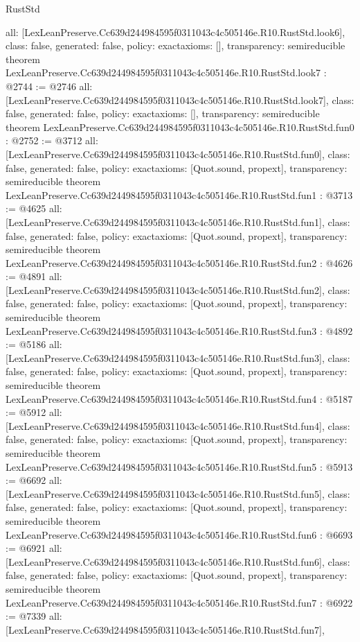 \begin{lexlean}{RustStd}
\begin{coremodule}
{  all: [LexLeanPreserve.Cc639d244984595f0311043c4c505146e.R10.RustStd.look6],
  class: false,
  generated: false,
  policy: exact{axioms: []},
  transparency: semireducible
}
theorem LexLeanPreserve.Cc639d244984595f0311043c4c505146e.R10.RustStd.look7 : @2744 := @2746 {
  all: [LexLeanPreserve.Cc639d244984595f0311043c4c505146e.R10.RustStd.look7],
  class: false,
  generated: false,
  policy: exact{axioms: []},
  transparency: semireducible
}
theorem LexLeanPreserve.Cc639d244984595f0311043c4c505146e.R10.RustStd.fun0 : @2752 := @3712 {
  all: [LexLeanPreserve.Cc639d244984595f0311043c4c505146e.R10.RustStd.fun0],
  class: false,
  generated: false,
  policy: exact{axioms: [Quot.sound, propext]},
  transparency: semireducible
}
theorem LexLeanPreserve.Cc639d244984595f0311043c4c505146e.R10.RustStd.fun1 : @3713 := @4625 {
  all: [LexLeanPreserve.Cc639d244984595f0311043c4c505146e.R10.RustStd.fun1],
  class: false,
  generated: false,
  policy: exact{axioms: [Quot.sound, propext]},
  transparency: semireducible
}
theorem LexLeanPreserve.Cc639d244984595f0311043c4c505146e.R10.RustStd.fun2 : @4626 := @4891 {
  all: [LexLeanPreserve.Cc639d244984595f0311043c4c505146e.R10.RustStd.fun2],
  class: false,
  generated: false,
  policy: exact{axioms: [Quot.sound, propext]},
  transparency: semireducible
}
theorem LexLeanPreserve.Cc639d244984595f0311043c4c505146e.R10.RustStd.fun3 : @4892 := @5186 {
  all: [LexLeanPreserve.Cc639d244984595f0311043c4c505146e.R10.RustStd.fun3],
  class: false,
  generated: false,
  policy: exact{axioms: [Quot.sound, propext]},
  transparency: semireducible
}
theorem LexLeanPreserve.Cc639d244984595f0311043c4c505146e.R10.RustStd.fun4 : @5187 := @5912 {
  all: [LexLeanPreserve.Cc639d244984595f0311043c4c505146e.R10.RustStd.fun4],
  class: false,
  generated: false,
  policy: exact{axioms: [Quot.sound, propext]},
  transparency: semireducible
}
theorem LexLeanPreserve.Cc639d244984595f0311043c4c505146e.R10.RustStd.fun5 : @5913 := @6692 {
  all: [LexLeanPreserve.Cc639d244984595f0311043c4c505146e.R10.RustStd.fun5],
  class: false,
  generated: false,
  policy: exact{axioms: [Quot.sound, propext]},
  transparency: semireducible
}
theorem LexLeanPreserve.Cc639d244984595f0311043c4c505146e.R10.RustStd.fun6 : @6693 := @6921 {
  all: [LexLeanPreserve.Cc639d244984595f0311043c4c505146e.R10.RustStd.fun6],
  class: false,
  generated: false,
  policy: exact{axioms: [Quot.sound, propext]},
  transparency: semireducible
}
theorem LexLeanPreserve.Cc639d244984595f0311043c4c505146e.R10.RustStd.fun7 : @6922 := @7339 {
  all: [LexLeanPreserve.Cc639d244984595f0311043c4c505146e.R10.RustStd.fun7],
}
\end{coremodule}
\end{lexlean}
